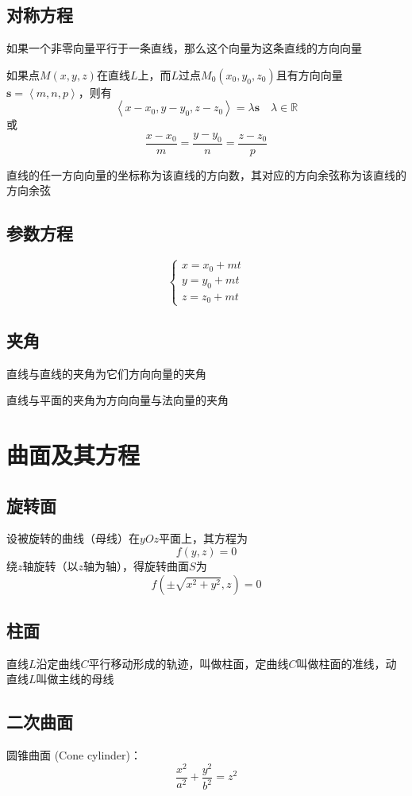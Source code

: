 \documentclass[UTF8]{ctexart}
\newcommand{\ve}[1]{{\bm{#1}}}
\newcommand{\veN}[3]{{\left\langle#1,#2,#3\right\rangle}}
\begin{document}
\subsection*{对称方程}
如果一个非零向量平行于一条直线，那么这个向量为这条直线的方向向量

如果点$M(x,y,z)$在直线$L$上，而$L$过点$M_0(x_0,y_0,z_0)$且有方向向量$\ve{s}=\veN{m}{n}{p}$，则有
\[\veN{x-x_0}{y-y_0}{z-z_0}=\lambda\ve{s}\quad\lambda\in\mathbb{R}\]
或
\[\frac{x-x_0}{m}=\frac{y-y_0}{n}=\frac{z-z_0}{p}\]

直线的任一方向向量的坐标称为该直线的方向数，其对应的方向余弦称为该直线的方向余弦
\subsection*{参数方程}
\[\begin{cases}
x=x_0+mt\\
y=y_0+mt\\
z=z_0+mt
\end{cases}\]

\subsection*{夹角}
直线与直线的夹角为它们方向向量的夹角

直线与平面的夹角为方向向量与法向量的夹角

\section*{曲面及其方程}

\subsection*{旋转面}
设被旋转的曲线（母线）在$yOz$平面上，其方程为
\[f(y,z)=0\]
绕$z$轴旋转（以$z$轴为轴），得旋转曲面$S$为
\[ f(\pm\sqrt{x^2+y^2},z)=0 \]

\subsection*{柱面}
直线$L$沿定曲线$C$平行移动形成的轨迹，叫做柱面，定曲线$C$叫做柱面的准线，动直线$L$叫做主线的母线

\subsection*{二次曲面}
圆锥曲面 (Cone cylinder)：
\[\frac{x^2}{a^2}+\frac{y^2}{b^2}=z^2\]
\end{document}
